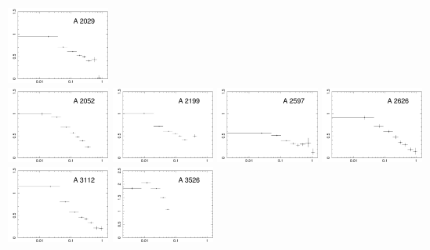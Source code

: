 \documentclass{aa}
\begin{document}
\begin{figure}[!]
                \includegraphics[width=0.236\textwidth,trim={0 0 0 0},clip]{fig_A2029_Fe.pdf} \\
                \includegraphics[width=0.236\textwidth,trim={0 0 0 0},clip]{fig_A2052_Fe.pdf}
                \includegraphics[width=0.236\textwidth,trim={0 0 0 0},clip]{fig_A2199_Fe.pdf}
                \includegraphics[width=0.236\textwidth,trim={0 0 0 0},clip]{fig_A2597_Fe.pdf}
                \includegraphics[width=0.236\textwidth,trim={0 0 0 0},clip]{fig_A2626_Fe.pdf} \\
                \includegraphics[width=0.236\textwidth,trim={0 0 0 0},clip]{fig_A3112_Fe.pdf}
                \includegraphics[width=0.236\textwidth,trim={0 0 0 0},clip]{fig_A3526_Fe.pdf}

\end{figure}
\end{document}
